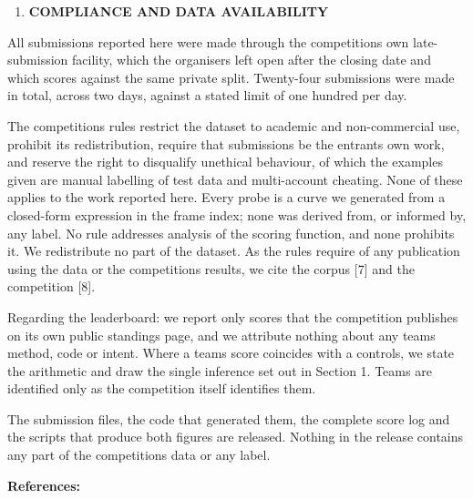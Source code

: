 \begin{enumerate}
\def\labelenumi{\arabic{enumi}.}
\setcounter{enumi}{8}
\item
  \textbf{COMPLIANCE AND DATA AVAILABILITY}
\end{enumerate}

All submissions reported here were made through the competition\textquotesingle s own late-submission facility, which the organisers left open after the closing date and which scores against the same private split. Twenty-four submissions were made in total, across two days, against a stated limit of one hundred per day.

The competition\textquotesingle s rules restrict the dataset to academic and non-commercial use, prohibit its redistribution, require that submissions be the entrant\textquotesingle s own work, and reserve the right to disqualify unethical behaviour, of which the examples given are manual labelling of test data and multi-account cheating. None of these applies to the work reported here. Every probe is a curve we generated from a closed-form expression in the frame index; none was derived from, or informed by, any label. No rule addresses analysis of the scoring function, and none prohibits it. We redistribute no part of the dataset. As the rules require of any publication using the data or the competition\textquotesingle s results, we cite the corpus {[}7{]} and the competition {[}8{]}.

Regarding the leaderboard: we report only scores that the competition publishes on its own public standings page, and we attribute nothing about any team\textquotesingle s method, code or intent. Where a team\textquotesingle s score coincides with a control\textquotesingle s, we state the arithmetic and draw the single inference set out in Section 1. Teams are identified only as the competition itself identifies them.

The submission files, the code that generated them, the complete score log and the scripts that produce both figures are released. Nothing in the release contains any part of the competition\textquotesingle s data or any label.

\textbf{References:}

